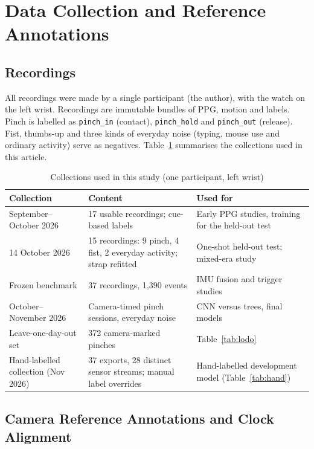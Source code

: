 \section{Data Collection and Reference Annotations}\label{sec:data}

\subsection{Recordings}

All recordings were made by a single participant (the author), with the watch on the left wrist. Recordings are immutable bundles of PPG, motion and labels. Pinch is labelled as \texttt{pinch\_in} (contact), \texttt{pinch\_hold} and \texttt{pinch\_out} (release). Fist, thumbs-up and three kinds of everyday noise (typing, mouse use and ordinary activity) serve as negatives. Table~\ref{tab:data} summarises the collections used in this article.

\begin{table}[t]
  \centering
  \caption{Collections used in this study (one participant, left wrist)}
  \label{tab:data}
  \small
  \begin{tabular}{@{}p{}p{}p{}@{}}
    \toprule
    Collection & Content & Used for \\
    \midrule
    September--October 2026 & 17 usable recordings; cue-based labels & Early PPG studies, training for the held-out test \\
    14 October 2026 & 15 recordings: 9 pinch, 4 fist, 2 everyday activity; strap refitted & One-shot held-out test; mixed-era study \\
    Frozen benchmark & 37 recordings, 1{,}390 events & IMU fusion and trigger studies \\
    October--November 2026 & Camera-timed pinch sessions, everyday noise & CNN versus trees, final models \\
    Leave-one-day-out set & 372 camera-marked pinches & Table~\ref{tab:lodo} \\
    Hand-labelled collection (Nov 2026) & 37 exports, 28 distinct sensor streams; manual label overrides & Hand-labelled development model (Table~\ref{tab:hand}) \\
    \bottomrule
  \end{tabular}
\end{table}

\subsection{Camera Reference Annotations and Clock Alignment}

